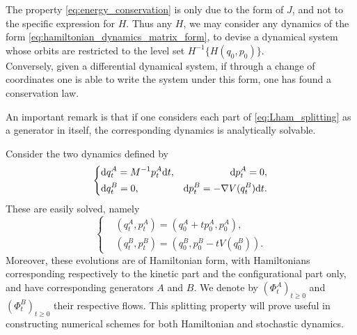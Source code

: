 \begin{remark}
    \label{rem:non_separable_hamiltonian}
    The property \eqref{eq:energy_conservation} is only due to the form of $J$, and not to the specific expression for $H$.
    Thus any $H$, we may consider any dynamics of the form \eqref{eq:hamiltonian_dynamics_matrix_form}, to devise a dynamical system whose orbits are restricted to the level set $H^{-1}\{H(q_0,p_0)\}$.\\
    Conversely, given a differential dynamical system, if through a change of coordinates one is able to write the system under this form, one has found a conservation law.
\end{remark}

    An important remark is that if one considers each part of \eqref{eq:Lham_splitting} as a generator in itself, the corresponding dynamics is analytically solvable.
    \begin{remark}
        \label{rem:Lham_splitting_semigroups}
        Consider the two dynamics defined by
        \begin{equation}
            \label{eq:Lham_splitting_dynamics}
            \left\{\begin{aligned}
                &\mathrm{d} q_t^A=M^{-1}p_t^A\mathrm{d} t, &\mathrm{d} p_t^A=0,\\
                &\mathrm{d} q_t^B=0, &\mathrm{d} p_t^B=-\nabla V(q_t^B)\mathrm{d} t.
            \end{aligned}\right.
        \end{equation}
        These are easily solved, namely
        \begin{equation}
            \label{eq:Lham_splitting_dynamics_solved}
            \left\{\begin{aligned}
                &\left(q_t^A,p_t^A\right)=\left(q_0^A+tp_0^A,p_0^A\right),\\
                &\left(q_t^B,p_t^B\right)=\left(q_0^B,p_0^B-tV\left(q_0^B\right)\right).
            \end{aligned}\right.
        \end{equation}
        Moreover, these evolutions are of Hamiltonian form, with Hamiltonians corresponding respectively to the kinetic part and the configurational part only, and have corresponding generators $A$ and $B$.
        We denote by $\left(\Phi^A_t\right)_{t\geq 0}$ and $\left(\Phi^B_t\right)_{t\geq 0}$ their respective flows. This splitting property will prove useful in constructing numerical schemes for both Hamiltonian and stochastic dynamics.
    \end{remark}


